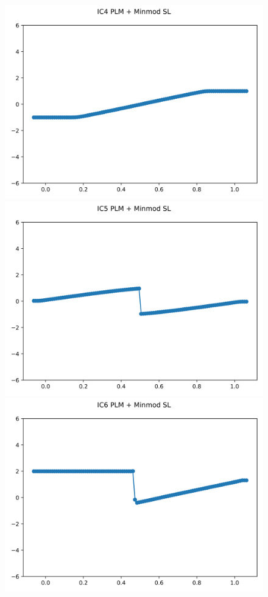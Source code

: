 \documentclass{article}
\begin{document}
\begin{figure}[t]
        \includegraphics[width=.95\textwidth]{../../code/hires_IC4Methodpm_plot.png}
        \includegraphics[width=.95\textwidth]{../../code/hires_IC5Methodpm_plot.png}
        \includegraphics[width=.95\textwidth]{../../code/hires_IC6Methodpm_plot.png}

\end{figure}
\end{document}
